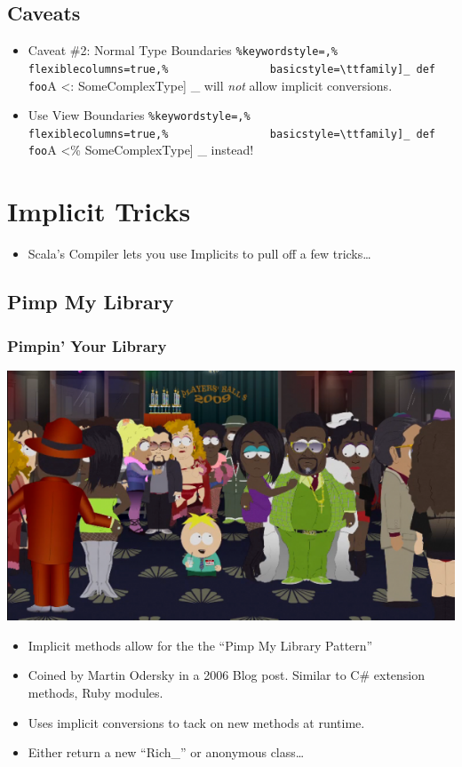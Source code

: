 \documentclass[xcolor=dvipsnames]{beamer}
\newcommand{\code}[1]{%
    \lstinline[%
               flexiblecolumns=true,%
               basicstyle=\ttfamily]_#1_}
\newenvironment{itemizeframe}
               {\begin{frame}\startitemizeframe} 
               {\stopitemizeframe\end{frame}}
\newcommand\startitemizeframe{\begin{itemize}} \newcommand\stopitemizeframe{\end{itemize}}
\begin{document}
\subsection{Caveats}
\begin{itemizeframe}
    \frametitle{Caveats of Implicits}
    \item Caveat \#2: Normal Type Boundaries \code{ def foo[A <: SomeComplexType] } will {\em not} allow implicit conversions.  
    \item Use View Boundaries \code { def foo[A <\% SomeComplexType] } instead!
\end{itemizeframe}

\section{Implicit Tricks}
\begin{itemizeframe}
    \frametitle{Tricks with Implicits}
    \item Scala's Compiler lets you use Implicits to pull off a few tricks\ldots
\end{itemizeframe}

\subsection{Pimp My Library}
\begin{frame}
    \frametitle{Pimpin' Your Library}
    \begin{center}
    \includegraphics[scale=0.5]{images/players_ball_southpark-600x335.png}
    \end{center}
\end{frame}
\begin{itemizeframe}
    \frametitle{Pimpin' Your Library}
    \item Implicit methods allow for the the ``Pimp My Library Pattern''
    \item Coined by Martin Odersky in a 2006 Blog post.  Similar to C\# extension methods, Ruby modules.
    \item Uses implicit conversions to tack on new methods at runtime.
    \item Either return a new ``Rich\_'' or anonymous class\ldots
        
\end{itemizeframe}
\end{document}
